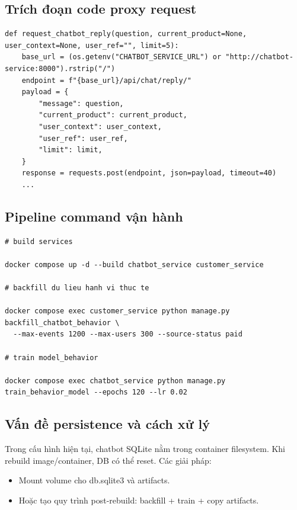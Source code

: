 \documentclass[12pt,a4paper]{article}
\begin{document}
\subsection{Trích đoạn code proxy request}
\begin{lstlisting}[style=pythonstyle,caption={Customer service request chatbot response},label={lst:customer-proxy}]
def request_chatbot_reply(question, current_product=None, user_context=None, user_ref="", limit=5):
    base_url = (os.getenv("CHATBOT_SERVICE_URL") or "http://chatbot-service:8000").rstrip("/")
    endpoint = f"{base_url}/api/chat/reply/"
    payload = {
        "message": question,
        "current_product": current_product,
        "user_context": user_context,
        "user_ref": user_ref,
        "limit": limit,
    }
    response = requests.post(endpoint, json=payload, timeout=40)
    ...
\end{lstlisting}

\subsection{Pipeline command vận hành}
\begin{lstlisting}[style=pythonstyle,caption={Chuỗi command deploy-build-train},label={lst:ops-cmd}]
# build services

docker compose up -d --build chatbot_service customer_service

# backfill du lieu hanh vi thuc te

docker compose exec customer_service python manage.py backfill_chatbot_behavior \
  --max-events 1200 --max-users 300 --source-status paid

# train model_behavior

docker compose exec chatbot_service python manage.py train_behavior_model --epochs 120 --lr 0.02
\end{lstlisting}

\subsection{Vấn đề persistence và cách xử lý}
Trong cấu hình hiện tại, chatbot SQLite nằm trong container filesystem. Khi rebuild image/container, DB có thể reset. Các giải pháp:
\begin{itemize}
  \item Mount volume cho db.sqlite3 và artifacts.
  \item Hoặc tạo quy trình post-rebuild: backfill + train + copy artifacts.
\end{itemize}
\end{document}
